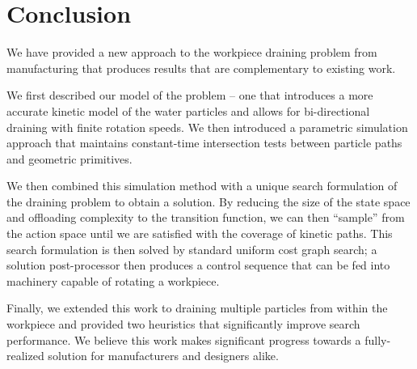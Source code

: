 						\chapter{Conclusion}

We have provided a new approach to the workpiece draining problem from manufacturing that produces results that are complementary to existing work.

We first described our model of the problem -- one that introduces a more accurate kinetic model of the water particles and allows for bi-directional draining with finite rotation speeds. We then introduced a parametric simulation approach that maintains constant-time intersection tests between particle paths and geometric primitives.

We then combined this simulation method with a unique search formulation of the draining problem to obtain a solution. By reducing the size of the state space and offloading complexity to the transition function, we can then ``sample'' from the action space until we are satisfied with the coverage of kinetic paths. This search formulation is then solved by standard uniform cost graph search; a solution post-processor then produces a control sequence that can be fed into machinery capable of rotating a workpiece.

Finally, we extended this work to draining multiple particles from within the workpiece and provided two heuristics that significantly improve search performance. We believe this work makes significant progress towards a fully-realized solution for manufacturers and designers alike.
